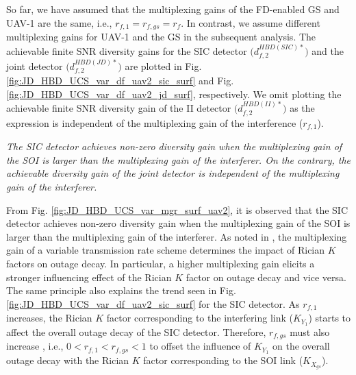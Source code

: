 So far, we have assumed that the multiplexing gains of the FD-enabled GS and UAV-1 are the same, i.e., $r_{f,1}=r_{f,gs}=r_f$. In contrast, we assume different multiplexing gains for UAV-1 and the GS in the subsequent analysis. The achievable finite SNR diversity gains for the SIC detector $\big(d_{f,2}^{HBD(SIC)*}\big)$ and the joint detector $\big(d_{f,2}^{HBD(JD)*}\big)$ are plotted in Fig. \ref{fig:JD_HBD_UCS_var_df_uav2_sic_surf} and Fig. \ref{fig:JD_HBD_UCS_var_df_uav2_jd_surf}, respectively. We omit plotting the achievable finite SNR diversity gain of the II detector $\big(d_{f,2}^{HBD(II)*}\big)$ as the expression is independent of the multiplexing gain of the interference ($r_{f,1}$).

\begin{observation}
\emph{\emph{The SIC detector achieves non-zero diversity gain when the multiplexing gain of the SOI is larger than the multiplexing gain of the interferer. On the contrary, the achievable diversity gain of the joint detector is independent of the multiplexing gain of the interferer.}
}\end{observation}

From Fig. \ref{fig:JD_HBD_UCS_var_mgr_surf_uav2}, it is observed that the SIC detector achieves non-zero diversity gain when the multiplexing gain of the SOI is larger than the multiplexing gain of the interferer. As noted in \cite{narasimhan2006finite}, the multiplexing gain of a variable transmission rate scheme determines the impact of Rician $K$ factors on outage decay. In particular, a higher multiplexing gain elicits a stronger influencing effect of the Rician $K$ factor on outage decay and vice versa. The same principle also explains the trend seen in Fig. \ref{fig:JD_HBD_UCS_var_df_uav2_sic_surf} for the SIC detector. As $r_{f,1}$ increases, the Rician $K$ factor corresponding to the interfering link ($K_{Y_1}$) starts to affect the overall outage decay of the SIC detector. Therefore, $r_{f,gs}$ must also increase , i.e., $0<r_{f,1}<r_{f,gs}<1$ to offset the influence of $K_{Y_1}$ on the overall outage decay with the Rician $K$ factor corresponding to the SOI link ($K_{X_{gs}}$).


